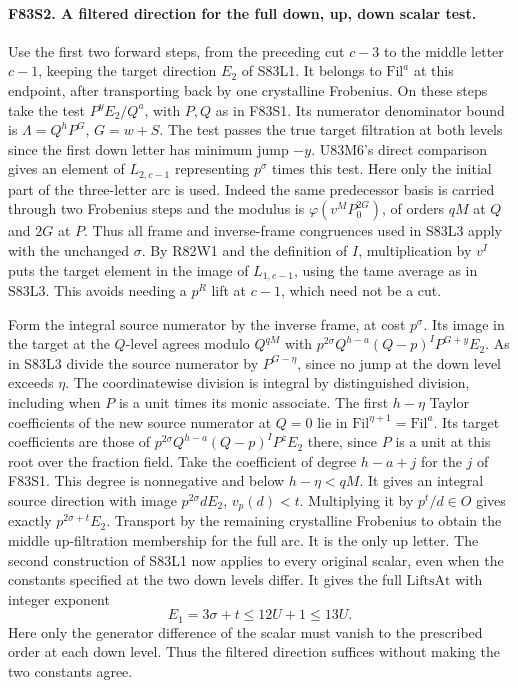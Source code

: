 \paragraph{F83S2. A filtered direction for the full down, up, down scalar test.}
Use the first two forward steps, from the preceding cut $c-3$ to the
middle letter $c-1$, keeping the target direction $E_2$ of S83L1.
It belongs to $\mathrm{Fil}^a$ at this endpoint, after transporting
back by one crystalline Frobenius. On these steps take the test
$P^yE_2/Q^a$, with $P,Q$ as in F83S1. Its numerator denominator
bound is $\Lambda=Q^hP^G$, $G=w+S$. The test passes the true
target filtration at both levels since the first down letter has
minimum jump $-y$. U83M6's direct comparison gives an element
of $L_{2,c-1}$ representing $p^\sigma$ times this test.
Here only the initial part of the three-letter arc is used.
Indeed the same predecessor basis is carried through two Frobenius
steps and the modulus is $\varphi(v^MP_0^{2G})$, of orders
$qM$ at $Q$ and $2G$ at $P$. Thus all frame and inverse-frame
congruences used in S83L3 apply with the unchanged $\sigma$.
By R82W1 and the definition of $I$, multiplication by $v^I$ puts
the target element in the image of $L_{1,c-1}$, using the tame
average as in S83L3. This avoids needing a $p^R$ lift at $c-1$,
which need not be a cut.

Form the integral source numerator by the inverse frame, at cost
$p^\sigma$. Its image in the target at the $Q$-level agrees modulo
$Q^{qM}$ with
$p^{2\sigma}Q^{h-a}(Q-p)^IP^{G+y} E_2$.
As in S83L3 divide the source numerator by $P^{G-\eta}$, since
no jump at the down level exceeds $\eta$. The coordinatewise
division is integral by distinguished division, including when
$P$ is a unit times its monic associate. The first $h-\eta$
Taylor coefficients of the new source numerator at $Q=0$ lie
in $\mathrm{Fil}^{\eta+1}=\mathrm{Fil}^a$. Its target coefficients
are those of $p^{2\sigma}Q^{h-a}(Q-p)^I P^z E_2$ there, since
$P$ is a unit at this root over the fraction field. Take the
coefficient of degree $h-a+j$ for the $j$ of F83S1. This degree
is nonnegative and below $h-\eta<qM$. It gives an integral
source direction with image $p^{2\sigma}d E_2$, $v_p(d)<t$.
Multiplying it by $p^t/d\in O$ gives exactly $p^{2\sigma+t}E_2$.
Transport by the remaining crystalline Frobenius to obtain the
middle up-filtration membership for the full arc. It is the
only up letter. The second construction of S83L1 now applies
to every original scalar, even when the constants specified at the
two down levels differ. It gives the full $\mathrm{LiftsAt}$
with integer exponent
\[
             E_1=3\sigma+t\le12U+1\le13U .
\]
Here only the generator difference of the scalar must vanish to
the prescribed order at each down level. Thus the filtered
direction suffices without making the two constants agree.
